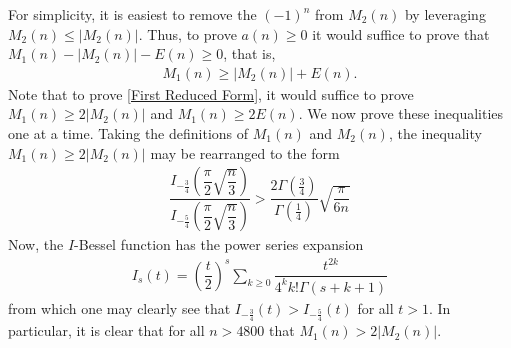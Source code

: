 \documentclass[11pt,reqno]{amsart}
\theoremstyle{definition}
\theoremstyle{plain}
\theoremstyle{named}
\numberwithin{equation}{section}
\theoremstyle{example}
\def\lp{\left(}
\def\rp{\right)}
\begin{document}
For simplicity, it is easiest to remove the $(-1)^n$ from $M_2(n)$ by leveraging $M_2(n) \leq \left|M_2(n)\right|$. Thus, to prove $a(n) \geq 0$ it would suffice to prove that $M_1(n) - \left|M_2(n)\right| - E(n) \geq 0$, that is,
\begin{align} \label{First Reduced Form}
	M_1(n) \geq \left|M_2(n)\right| + E(n).
\end{align}
Note that to prove \eqref{First Reduced Form}, it would suffice to prove $M_1(n) \geq 2 \left|M_2(n)\right|$ and $M_1(n) \geq 2 E(n)$. We now prove these inequalities one at a time. Taking the definitions of $M_1(n)$ and $M_2(n)$, the inequality $M_1(n) \geq 2\left|M_2(n)\right|$ may be rearranged to the form
\begin{align*}
	\dfrac{I_{-\frac 34}\lp \dfrac{\pi}{2} \sqrt{\dfrac{n}{3}} \rp}{I_{-\frac 54}\lp \dfrac{\pi}{2} \sqrt{\dfrac{n}{3}} \rp} > \dfrac{2 \Gamma\lp \frac 34 \rp}{\Gamma\lp \frac 14 \rp} \sqrt{\dfrac{\pi}{6n}}
\end{align*}
Now, the $I$-Bessel function has the power series expansion
\begin{align*}
	I_s(t) = \lp \dfrac{t}{2} \rp^s \sum_{k\geq 0} \dfrac{t^{2k}}{4^k k! \Gamma\lp s + k + 1 \rp}
\end{align*}
from which one may clearly see that $I_{-\frac 34}(t) > I_{-\frac 54}(t)$ for all $t > 1$. In particular, it is clear that for all $n > 4800$ that $M_1(n) > 2\left|M_2(n)\right|$. 
\end{document}
